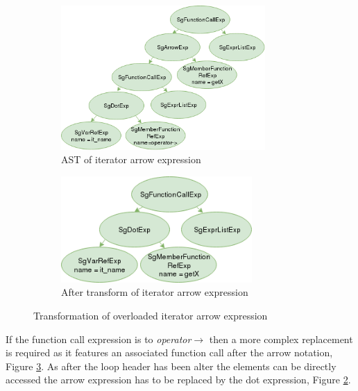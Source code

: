 \documentclass[bsc,frontabs,singlespacing,parskip,deptreport]{infthesis}
\begin{document}
\begin{figure}[H]
    \begin{subfigure}[b]{0.5\textwidth}
        \centering
            \includegraphics[height=5.5cm]{images/iterator-arrow-replace-ast.png}
        \caption{AST of iterator arrow expression}
        \label{fig:iter-AST-Trans-arrow-before}
    \end{subfigure}
    \hfill
    \begin{subfigure}[b]{0.5\textwidth}
        \centering
            \includegraphics[width=0.8\textwidth]{images/iterator-arrow-replace-ast-after.png}
        \caption{After transform of iterator arrow expression}
        \label{fig:iter-AST-Trans-arrow-after}
    \end{subfigure}
    \vspace{-0.5cm}
    \caption{Transformation of overloaded iterator arrow expression}
    \label{fig:iter-arrow-use-trans}
\end{figure}

If the function call expression is to \textit{operator$\rightarrow$} then a more complex replacement is required as it features an associated function call after the arrow notation, Figure \ref{fig:iter-arrow-use-trans}. As after the loop header has been alter the elements can be directly accessed the arrow expression has to be replaced by the dot expression, Figure \ref{fig:iter-AST-Trans-arrow-after}. 
\end{document}
